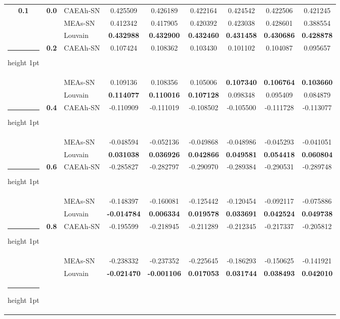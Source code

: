 \documentclass[10pt, journal]{IEEEtran}
\makeatletter
\newcommand{\thickhline}{%
    \noalign {\ifnum 0=`}\fi \hrule height 1pt
    \futurelet \reserved@a \@xhline
}
\makeatother
\begin{document}
\begin{table}[!htbp]
\begin{tabular}{|c|c|l|c|c|c|c|c|c|}
\multirow{3}{*}{\textbf{0.1}} & \multirow{3}{*}{\textbf{0.0}}
  & CAEAh-SN & 0.425509 & 0.426189 & 0.422164 & 0.424542 & 0.422506 & 0.421245 \\ \cline{3-9}
  & & MEAs-SN & 0.412342 & 0.417905 & 0.420392 & 0.423038 & 0.428601 & 0.388554 \\ \cline{3-9}
  & & Louvain & \textbf{0.432988} & \textbf{0.432900} & \textbf{0.432460} & \textbf{0.431458} & \textbf{0.430686} & \textbf{0.428878} \\ \thickhline
\multirow{3}{*}{\textbf{0.1}} & \multirow{3}{*}{\textbf{0.2}}
  & CAEAh-SN & 0.107424 & 0.108362 & 0.103430 & 0.101102 & 0.104087 & 0.095657 \\ \cline{3-9}
  & & MEAs-SN & 0.109136 & 0.108356 & 0.105006 & \textbf{0.107340} & \textbf{0.106764} & \textbf{0.103660}\\ \cline{3-9}
  & & Louvain & \textbf{0.114077} & \textbf{0.110016} & \textbf{0.107128} & 0.098348 & 0.095409 & 0.084879 \\ \thickhline
\multirow{3}{*}{\textbf{0.1}} & \multirow{3}{*}{\textbf{0.4}}
  & CAEAh-SN & -0.110909 & -0.111019 & -0.108502 & -0.105500 & -0.111728 & -0.113077 \\ \cline{3-9}
  & & MEAs-SN & -0.048594 & -0.052136 & -0.049868 & -0.048986 & -0.045293 & -0.041051 \\ \cline{3-9}
  & & Louvain & \textbf{0.031038} & \textbf{0.036926} & \textbf{0.042866} & \textbf{0.049581} & \textbf{0.054418} & \textbf{0.060804} \\ \thickhline
\multirow{3}{*}{\textbf{0.1}} & \multirow{3}{*}{\textbf{0.6}}
  & CAEAh-SN & -0.285827 & -0.282797 & -0.290970 & -0.289384 & -0.290531 & -0.289748 \\ \cline{3-9}
  & & MEAs-SN & -0.148397 & -0.160081 & -0.125442 & -0.120454 & -0.092117 & -0.075886 \\ \cline{3-9}
  & & Louvain & \textbf{-0.014784} & \textbf{0.006334} & \textbf{0.019578} & \textbf{0.033691} & \textbf{0.042524} & \textbf{0.049738} \\ \thickhline
\multirow{3}{*}{\textbf{0.1}} & \multirow{3}{*}{\textbf{0.8}}
  & CAEAh-SN & -0.195599 & -0.218945 & -0.211289 & -0.212345 & -0.217337 & -0.205812 \\ \cline{3-9}
  & & MEAs-SN & -0.238332 & -0.237352 & -0.225645 & -0.186293 & -0.150625 & -0.141921 \\ \cline{3-9}
  & & Louvain & \textbf{-0.021470} & \textbf{-0.001106} & \textbf{0.017053} & \textbf{0.031744} & \textbf{0.038493} & \textbf{0.042010} \\ \thickhline
\end{tabular}
\end{table}
\end{document}
